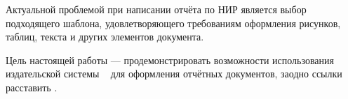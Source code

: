 
Актуальной проблемой при написании отчёта по НИР является выбор подходящего шаблона, удовлетворяющего требованиям оформления рисунков, таблиц, текста и других элементов документа.

Цель настоящей работы --- продемонстрировать возможности использования издательской системы \LaTeXe\  \cite{kotelnikov} для оформления отчётных документов, заодно ссылки расставить \cite{SoetaertRJ2010}.